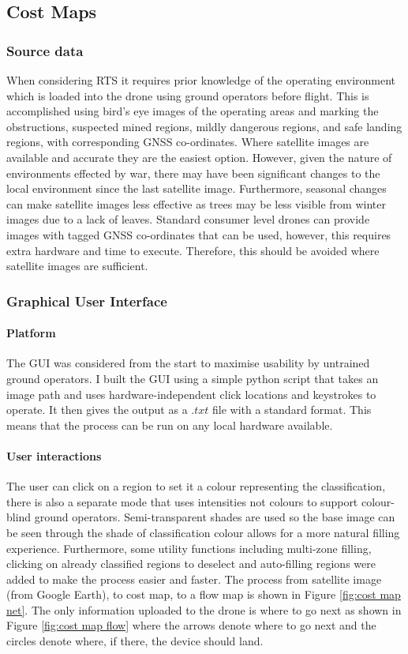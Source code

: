 \subsection{Cost Maps}\label{sub_section:tgt_cost_maps}
\subsubsection{Source data}\label{sub_sub_section:tgt_source_data}
When considering \gls{RTS} it requires prior knowledge of the operating environment which is loaded into the drone using ground operators before flight. This is accomplished using bird's eye images of the operating areas and marking the obstructions, suspected mined regions, mildly dangerous regions, and safe landing regions, with corresponding \gls{GNSS} co-ordinates.
Where satellite images are available and accurate they are the easiest option. However, given the nature of environments effected by war, there may have been significant changes to the local environment since the last satellite image. Furthermore, seasonal changes can make satellite images less effective as trees may be less visible from winter images due to a lack of leaves.
Standard consumer level drones can provide images with tagged \gls{GNSS} co-ordinates that can be used, however, this requires extra hardware and time to execute. Therefore, this should be avoided where satellite images are sufficient.

\subsubsection{Graphical User Interface}\label{sub_sub_section:tgt_GUI}
\paragraph{Platform} 
The \gls{GUI} was considered from the start to maximise usability by untrained ground operators. I built the \gls{GUI} using a simple python script that takes an image path and uses hardware-independent click locations and keystrokes to operate. It then gives the output as a $.txt$ file with a standard format. This means that the process can be run on any local hardware available.
\paragraph{User interactions}
The user can click on a region to set it a colour representing the classification, there is also a separate mode that uses intensities not colours to support colour-blind ground operators. Semi-transparent shades are used so the base image can be seen through the shade of classification colour allows for a more natural filling experience. Furthermore, some utility functions including multi-zone filling, clicking on already classified regions to deselect and auto-filling regions were added to make the process easier and faster. The process from satellite image (from Google Earth), to cost map, to a flow map is shown in Figure \ref{fig:cost map net}. The only information uploaded to the drone is where to go next as shown in Figure \ref{fig:cost map flow} where the arrows denote where to go next and the circles denote where, if there, the device should land.

